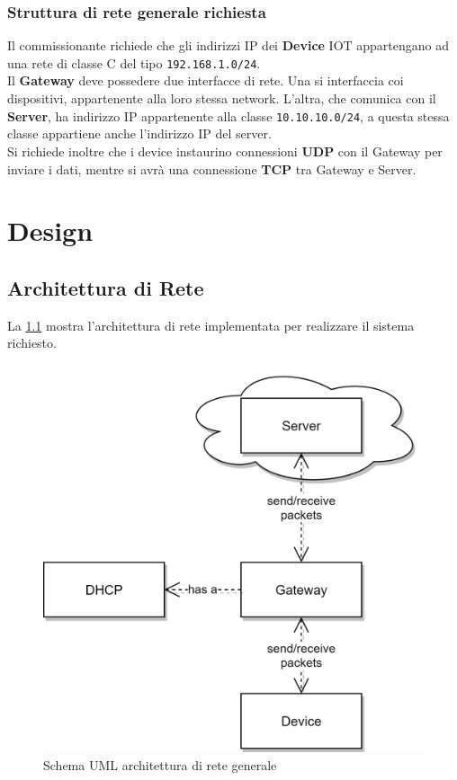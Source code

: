 \documentclass[a4paper,12pt]{report}
\begin{document}
\subsection*{Struttura di rete generale richiesta}
Il commissionante richiede che gli indirizzi IP dei \textbf{Device} IOT appartengano ad una rete di classe C del tipo \texttt{192.168.1.0/24}.\\
Il \textbf{Gateway} deve possedere due interfacce di rete. Una si interfaccia coi dispositivi, appartenente alla loro stessa network. L'altra, che comunica con il \textbf{Server}, ha indirizzo IP appartenente alla classe \texttt{10.10.10.0/24}, a questa stessa classe appartiene anche l'indirizzo IP del server.\\
Si richiede inoltre che i device instaurino connessioni \textbf{UDP} con il Gateway per inviare i dati, mentre si avrà una connessione \textbf{TCP} tra Gateway e Server.

\chapter{Design}

\section{Architettura di Rete}
La \cref{img:ArchitetturaGenerale} mostra l'architettura di rete implementata per realizzare il sistema richiesto.

\begin{figure}[H]
    \begin{center}
        \centering
        \includegraphics[scale=1]{UML/ArchitetturaGenerale.png}
    \end{center}
    \caption{Schema UML architettura di rete generale}
    \label{img:ArchitetturaGenerale}
\end{figure}
\
\\
%
\end{document}
